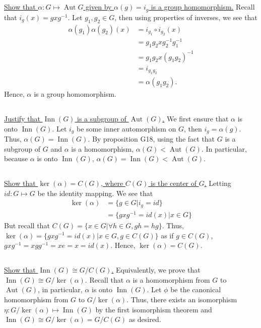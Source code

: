 \documentclass[10pt,a4paper]{report}
\newcommand{\inn}{\operatorname{Inn}}
\newcommand{\aut}{\operatorname{Aut}}
\begin{document}
	\subsection{}
	\underline{Show that $\alpha:G\mapsto \aut{G}$ given by $\alpha(g)=i_{g}$ is a group homomorphism.}\newline
	\indent Recall that $i_{g}(x)=gxg^{-1}$. Let $g_{1},g_{2}\in G$, then using properties of inverses, we see that 
		\begin{align*}
			\alpha(g_{1})\alpha(g_{2})(x) &= i_{g_{1}}\circ i_{g_{2}}(x) \\
										&= g_{1}g_{2}x g_{2}^{-1}g_{1}^{-1} \\
										&= g_{1}g_{2}x (g_{1}g_{2})^{-1} \\
										&= i_{g_{1}g_{2}} \\
										&= \alpha(g_{1}g_{2}).
		\end{align*} 
	Hence, $\alpha$ is a group homomorphism.
	
	\subsection{}
	\underline{Justify that $\inn(G)$ is a subgroup of $\aut(G)$.}\newline
	\indent  We first ensure that $\alpha$ is onto $\inn(G)$. Let $i_{g}$ be some inner automorphism on $G$, then $i_{g}=\alpha(g)$. Thus, $\alpha(G)=\inn(G)$. By proposition G18, using the fact that $G$ is a subgroup of $G$ and $\alpha$ is a homomorphism, $\alpha(G)<\aut(G)$. In particular, because $\alpha$ is onto $\inn(G)$, $\alpha(G)=\inn(G)<\aut(G)$.
	
	\subsection{}
	\underline{Show that $\ker(\alpha)=C(G)$, where $C(G)$ is the center of $G$.}\newline
	\indent Letting $id:G\mapsto G$ be the identity mapping. We see that 
	\begin{align*}
		\ker(\alpha) &= \{g\in G|i_{g}=id\} \\
					 &= \{gxg^{-1}=id(x)|x\in G\}
	\end{align*}
	But recall that $C(G)=\{x\in G|\forall h\in G,gh=hg\}$. Thus, $\ker(\alpha) = \{gxg^{-1}=id(x)|x\in G, g\in C(G)\}$ as if $g\in C(G)$, $gxg^{-1}=xgg^{-1}=xe=x=id(x)$. Hence, $\ker(\alpha)=C(G)$.
	
	\subsection{}
	\underline{Show that $\inn(G)\cong G/C(G)$.}\newline
	\indent Equivalently, we prove that $\inn(G)\cong G/\ker(\alpha)$. Recall that $\alpha$ is a homomorphism from $G$ to $\aut(G)$, in particular, $\alpha$ is onto $\inn(G)$. Let $\phi$ be the canonical homomorphism from $G$ to $G/\ker(\alpha)$. Thus, there exists an isomorphism $\eta:G/\ker(\alpha)\mapsto \inn(G)$ by the first isomorphism theorem and $\inn(G)\cong G/\ker(\alpha)=G/C(G)$ as desired.
	
\end{document}

